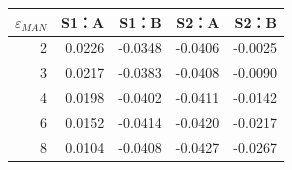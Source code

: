 \begin{tabular}{rrrrr}
\toprule
$\varepsilon_{MAN}$ & S1：A & S1：B & S2：A & S2：B \\
\midrule
2 & 0.0226 & -0.0348 & -0.0406 & -0.0025 \\
3 & 0.0217 & -0.0383 & -0.0408 & -0.0090 \\
4 & 0.0198 & -0.0402 & -0.0411 & -0.0142 \\
6 & 0.0152 & -0.0414 & -0.0420 & -0.0217 \\
8 & 0.0104 & -0.0408 & -0.0427 & -0.0267 \\
\bottomrule
\end{tabular}
